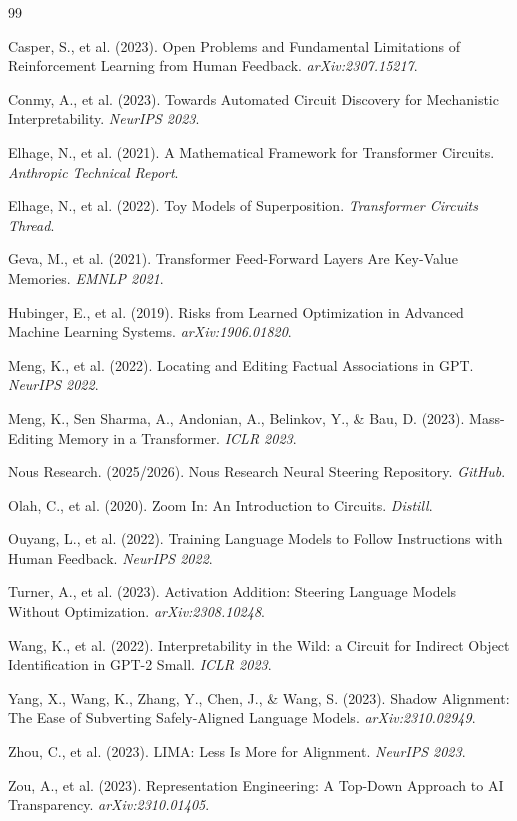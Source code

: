\documentclass[11pt]{article}
\begin{document}
\begin{thebibliography}{99}

Casper, S., et al. (2023). Open Problems and Fundamental Limitations of Reinforcement Learning from Human Feedback. \textit{arXiv:2307.15217}.

Conmy, A., et al. (2023). Towards Automated Circuit Discovery for Mechanistic Interpretability. \textit{NeurIPS 2023}.

Elhage, N., et al. (2021). A Mathematical Framework for Transformer Circuits. \textit{Anthropic Technical Report}.

Elhage, N., et al. (2022). Toy Models of Superposition. \textit{Transformer Circuits Thread}.

Geva, M., et al. (2021). Transformer Feed-Forward Layers Are Key-Value Memories. \textit{EMNLP 2021}.

Hubinger, E., et al. (2019). Risks from Learned Optimization in Advanced Machine Learning Systems. \textit{arXiv:1906.01820}.

Meng, K., et al. (2022). Locating and Editing Factual Associations in GPT. \textit{NeurIPS 2022}.

Meng, K., Sen Sharma, A., Andonian, A., Belinkov, Y., \& Bau, D. (2023). Mass-Editing Memory in a Transformer. \textit{ICLR 2023}.

Nous Research. (2025/2026). Nous Research Neural Steering Repository. \textit{GitHub}.

Olah, C., et al. (2020). Zoom In: An Introduction to Circuits. \textit{Distill}.

Ouyang, L., et al. (2022). Training Language Models to Follow Instructions with Human Feedback. \textit{NeurIPS 2022}.

Turner, A., et al. (2023). Activation Addition: Steering Language Models Without Optimization. \textit{arXiv:2308.10248}.

Wang, K., et al. (2022). Interpretability in the Wild: a Circuit for Indirect Object Identification in GPT-2 Small. \textit{ICLR 2023}.

Yang, X., Wang, K., Zhang, Y., Chen, J., \& Wang, S. (2023). Shadow Alignment: The Ease of Subverting Safely-Aligned Language Models. \textit{arXiv:2310.02949}.

Zhou, C., et al. (2023). LIMA: Less Is More for Alignment. \textit{NeurIPS 2023}.

Zou, A., et al. (2023). Representation Engineering: A Top-Down Approach to AI Transparency. \textit{arXiv:2310.01405}.

\end{thebibliography}
\end{document}
